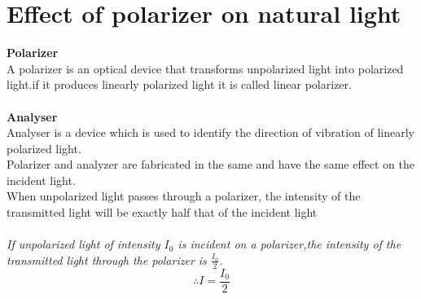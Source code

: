   \section{Effect of polarizer on natural light}
  \textbf{Polarizer}\\
  A polarizer is an optical device that transforms unpolarized light into polarized light.if it produces linearly polarized light it is called linear polarizer.\\\\
  \textbf{Analyser} \\
  Analyser is a device which is used to identify the direction of vibration of linearly polarized light.\\
  Polarizer and analyzer are fabricated in the same and have the same effect on the incident light.\\
         When unpolarized light passes through a polarizer, the intensity of the transmitted light will be exactly half that of the incident light \\\\
         \textit{If unpolarized light of intensity $I_0$ is incident on a polarizer,the intensity of the transmitted light through the polarizer is $\frac{I_0}{2}$.}
         $$\therefore I=\frac{I_0}{2}$$
